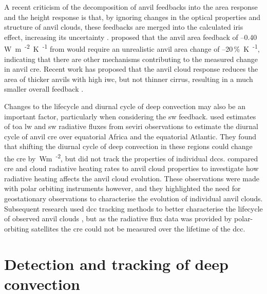 A recent criticism of the \citet{sherwood_assessment_2020} decomposition of anvil feedbacks into the area response and the height response is that, by ignoring changes in the optical properties and structure of anvil clouds, these feedbacks are merged into the calculated iris effect, increasing its uncertainty \citep{raghuraman_observational_2024}.
\citet{mckim_weak_2024} proposed that the anvil area feedback of --0.40\,\unit{W m\textsuperscript{-2} K\textsuperscript{-1}} from \citet{sherwood_assessment_2020} would require an unrealistic anvil area change of --20\,\unit{\% K\textsuperscript{-1}}, indicating that there are other mechanisms contributing to the measured change in anvil \acrshort{cre}.
Recent work has proposed that the anvil cloud response reduces the area of thicker anvils with high \acrshort{iwc}, but not thinner cirrus, resulting in a much smaller overall feedback \citep{mckim_weak_2024, sokol_greater_2024}.

Changes to the lifecycle and diurnal cycle of deep convection may also be an important factor, particularly when considering the \acrshort{sw} feedback. 
\citet{nowicki_observations_2004} used estimates of \acrfull{toa} \acrshort{lw} and \acrshort{sw} radiative fluxes from \acrfull{seviri} observations to estimate the diurnal cycle of anvil \acrshort{cre} over equatorial Africa and the equatorial Atlantic. 
They found that shifting the diurnal cycle of deep convection in these regions could change the \acrshort{cre} by \,\unit{Wm\textsuperscript{-2}}, but did not track the properties of individual \acrshort{dcc}s.
\citet{bouniol_macrophysical_2016} compared \acrshort{cre} and cloud radiative heating rates to anvil cloud properties to investigate how radiative heating affects the anvil cloud evolution.
These observations were made with polar orbiting instruments however, and they highlighted the need for geostationary observations to characterise the evolution of individual anvil clouds.
Subsequent research used \acrshort{dcc} tracking methods to better characterise the lifecycle of observed anvil clouds \citep{bouniol_life_2021}, but as the radiative flux data was provided by polar-orbiting satellites the \acrshort{cre} could not be measured over the lifetime of the \acrshort{dcc}.


\section{Detection and tracking of deep convection} \label{sec:tracking_timeline}

